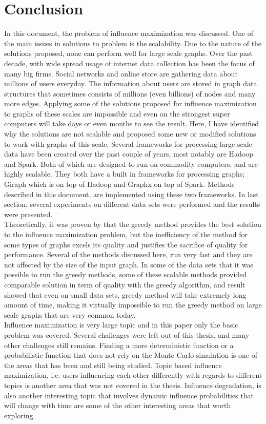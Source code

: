 \documentclass[english]{tktltiki}
\begin{document}
\section{Conclusion}
\label{sec:conclusion}
In this document, the problem of influence maximization was discussed. One of the main issues in solutions to problem is the scalability. Due to the nature of the solutions proposed, none can perform well for large scale graphs. Over the past decade, with wide spread usage of internet data collection has been the focus of many big firms. Social networks and online store are gathering data about millions of users everyday. The information about users are stored in graph data structures that sometimes consists of millions (even billions) of nodes and  many more edges. Applying some of the solutions proposed for influence maximization to graphs of these scales are impossible and even on the strongest super computers will take days or even months to see the result. Here, I have identified why the solutions are not scalable and proposed some new or modified solutions to work with graphs of this scale. Several frameworks for processing large scale data have been created over the past couple of years, most notably are Hadoop and Spark. Both of which are designed to run on commodity computers, and are highly scalable. They both have a built in frameworks for processing graphs; Giraph which is on top of Hadoop and Graphx on top of Spark. Methods described in this document, are implemented using these two frameworks. In last section, several experiments on different data sets were performed and the results were presented. \\
Theoretically, it was proven by \cite{kempe03} that the greedy method provides the best solution to the influence maximization problem, but the inefficiency of the method for some types of graphs excels its quality and justifies the sacrifice of quality for performance. Several of the methods discussed here, run very fast and they are not affected by the size of the input graph. In some of the data sets that it was possible to run the greedy methods, some of these scalable methods provided comparable solution in term of quality with the greedy algorithm, and result showed that even on small data sets, greedy method will take extremely long amount of time, making it virtually impossible to run the greedy method on large scale graphs that are very common today. \\
Influence maximization is very large topic and in this paper only the basic problem was covered. Several challenges were left out of this thesis, and many other challenges still remains. Finding a more deterministic function or a probabilistic function that does not rely on the Monte Carlo simulation is one of the areas that has been and still being studied. Topic based influence maximization, i.e. users influencing each other differently with regards to different topics is another area that was not covered in the thesis. Influence degradation, is also another interesting topic that involves dynamic influence probabilities that will change with time are some of the other interesting areas that worth exploring.

\pagebreak





\lastpage
\appendices
\pagestyle{empty}
\end{document}
